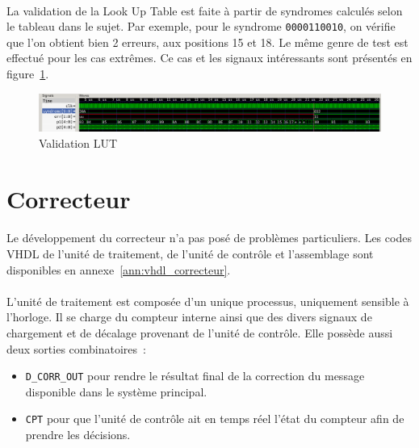 \documentclass[a4paper, 11pt, svgnames]{report}
\begin{document}
            \paragraph{}
                La validation de la Look Up Table est faite à partir de
                syndromes calculés selon le tableau dans le sujet. Par exemple,
                pour le syndrome \verb|0000110010|, on vérifie que l'on obtient
                bien 2 erreurs, aux positions 15 et 18. Le même genre de test
                est effectué pour les cas extrêmes. Ce cas et les signaux
                intéressants sont présentés en figure~\ref{fig:sim_lut}.

                \begin{figure}[H]
                    \centering
                    \includegraphics[width=\textwidth]{./images/lut_simu}
                    \caption{Validation LUT}
                    \label{fig:sim_lut}
                \end{figure}

        \section{Correcteur}
            \paragraph{}
                Le développement du correcteur n'a pas posé de problèmes
                particuliers. Les codes VHDL de l'unité de traitement, de
                l'unité de contrôle et l'assemblage sont disponibles en
                annexe~\ref{ann:vhdl_correcteur}.

            \paragraph{}
                L'unité de traitement est composée d'un unique processus,
                uniquement sensible à l'horloge. Il se charge du compteur
                interne ainsi que des divers signaux de chargement et de
                décalage provenant de l'unité de contrôle.
                Elle possède aussi deux sorties combinatoires~:
                 \begin{itemize}
                    \item \verb|D_CORR_OUT| pour rendre le résultat final de la
                        correction du message disponible dans le système principal.
                    \item \verb|CPT| pour que l'unité de contrôle ait en temps
                        réel l'état du compteur afin de prendre les décisions.
                \end{itemize}
\end{document}
